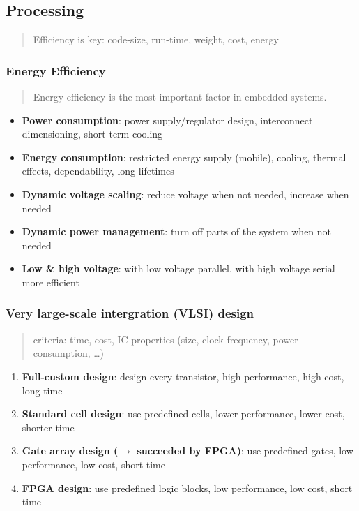 \documentclass{article}
\begin{document}
\subsection{Processing}
\begin{quote}Efficiency is key: code-size, run-time, weight, cost, energy\end{quote}

\subsubsection{Energy Efficiency}
\begin{quote}Energy efficiency is the most important factor in embedded systems.\end{quote}
\begin{itemize}
  \item \textbf{Power consumption}: power supply/regulator design, interconnect dimensioning, short term cooling
  \item \textbf{Energy consumption}: restricted energy supply (mobile), cooling, thermal effects, dependability, long lifetimes
\end{itemize}

\begin{itemize}
  \item \textbf{Dynamic voltage scaling}: reduce voltage when not needed, increase when needed
  \item \textbf{Dynamic power management}: turn off parts of the system when not needed
  \item \textbf{Low \& high voltage}: with low voltage parallel, with high voltage serial more efficient
\end{itemize}


\subsubsection{Very large-scale intergration (VLSI) design}
\begin{quote}criteria: time, cost, IC properties (size, clock frequency, power consumption, …)\end{quote}

\begin{enumerate}
  \item \textbf{Full-custom design}: design every transistor, high performance, high cost, long time
  \item \textbf{Standard cell design}: use predefined cells, lower performance, lower cost, shorter time
  \item \textbf{Gate array design ($\to$ succeeded by FPGA)}: use predefined gates, low performance, low cost, short time
  \item \textbf{FPGA design}: use predefined logic blocks, low performance, low cost, short time
\end{enumerate}
\end{document}
